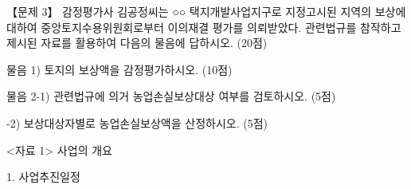 \begin{longquestion}{【문제 3】}
감정평가사 김공정씨는 ○○ 택지개발사업지구로 지정고시된 지역의 보상에 대하여 중앙토지수용위원회로부터 이의재결 평가를 의뢰받았다. 관련법규를 참작하고 제시된 자료를 활용하여 다음의 물음에 답하시오. (20점) \par
\medskip\noindent 물음 1) 토지의 보상액을 감정평가하시오. (10점) \par
\medskip\noindent 물음 2-1) 관련법규에 의거 농업손실보상대상 여부를 검토하시오. (5점) \par
\medskip{}-2) 보상대상자별로 농업손실보상액을 산정하시오. (5점) \par
<자료 1> 사업의 개요 \par
{\small\centering
{}\par}

1. 사업추진일정 \par
{\small\centering
{}\par}


\end{longquestion}
